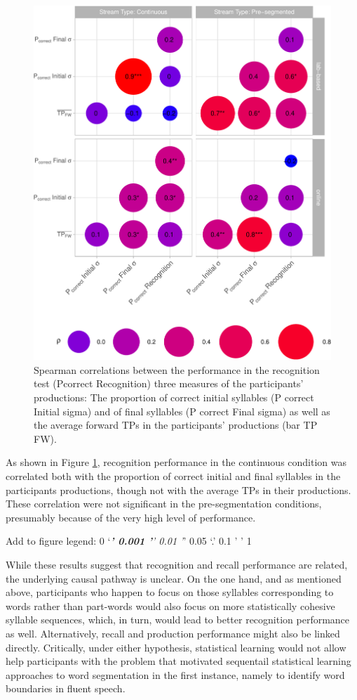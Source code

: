 \documentclass[
]{article}
\begin{document}
\begin{figure}

{\centering \includegraphics[width=0.8\linewidth]{segmentation_recall_combined_for_revision4_files/figure-latex/correlation-recognition-vs-position-plot-1} 

}

\caption{Spearman correlations between the performance in the recognition test (P{correct} Recognition) three measures of the participants' productions: The proportion of correct initial syllables (P {correct} Initial sigma) and of final syllables (P {correct} Final sigma) as well as the average forward TPs in the participants' productions (bar {TP {FW}}).}\label{fig:correlation-recognition-vs-position-plot}
\end{figure}

As shown in Figure \ref{fig:correlation-recognition-vs-position-plot},
recognition performance in the continuous condition was correlated both
with the proportion of correct initial and final syllables in the
participants productions, though not with the average TPs in their
productions. These correlation were not significant in the
pre-segmentation conditions, presumably because of the very high level
of performance.

Add to figure legend: 0 `\emph{\textbf{' 0.001 '}' 0.01 '}' 0.05 `.' 0.1
' ' 1

While these results suggest that recognition and recall performance are
related, the underlying causal pathway is unclear. On the one hand, and
as mentioned above, participants who happen to focus on those syllables
corresponding to words rather than part-words would also focus on more
statistically cohesive syllable sequences, which, in turn, would lead to
better recognition performance as well. Alternatively, recall and
production performance might also be linked directly. Critically, under
either hypothesis, statistical learning would not allow help
participants with the problem that motivated sequentail statistical
learning approaches to word segmentation in the first instance, namely
to identify word boundaries in fluent speech.
\end{document}
